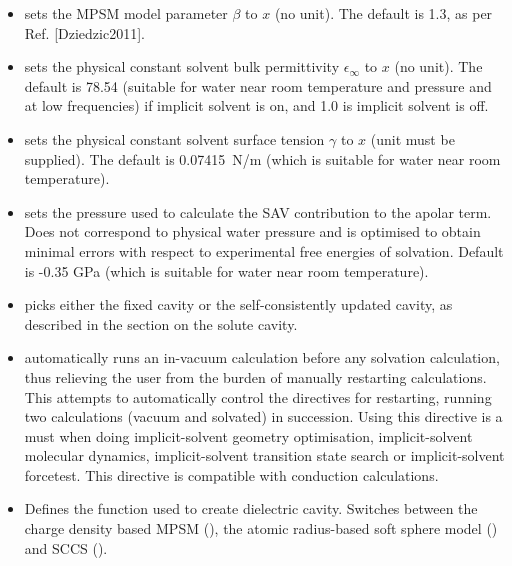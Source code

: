 \documentclass[letterpaper,10pt,english]{sphinxmanual}
\begin{document}
\begin{itemize}
\item {} 
 sets the MPSM model parameter \(\beta\)
to \(x\) (no unit). The default is 1.3, as per Ref. {[}Dziedzic2011{]}.

\item {} 
 sets the physical constant \textendash{} solvent bulk
permittivity \(\epsilon_{\infty}\) to \(x\) (no unit). The
default is 78.54 (suitable for water near room temperature and
pressure and at low frequencies) if implicit solvent is on, and 1.0
is implicit solvent is off.

\item {} 
 sets the physical constant \textendash{} solvent
surface tension \(\gamma\) to \(x\) (unit must be supplied).
The default is 0.07415 N/m (which is suitable for water near room
temperature).

\item {} 
 sets the pressure used to calculate the
SAV contribution to the apolar term. Does not correspond to physical
water pressure and is optimised to obtain minimal errors with respect
to experimental free energies of solvation. Default is -0.35 GPa
(which is suitable for water near room temperature).

\item {} 
 picks either the
fixed cavity or the self-consistently updated cavity, as described in
the section on the solute cavity.

\item {} 
 automatically runs an in-vacuum calculation
before any solvation calculation, thus relieving the user from the
burden of manually restarting calculations. This attempts to
automatically control the directives for restarting, running two
calculations (vacuum and solvated) in succession. Using this
directive is a must when doing implicit-solvent geometry
optimisation, implicit-solvent molecular dynamics, implicit-solvent
transition state search or implicit-solvent forcetest. This directive
is compatible with conduction calculations.

\item {} 
 Defines the
function used to create dielectric cavity. Switches between the
charge density based MPSM (), the atomic radius-based soft
sphere model () and SCCS ().


\end{itemize}
\end{document}
